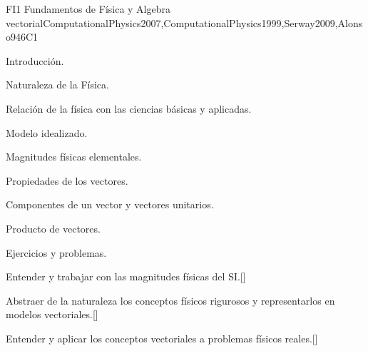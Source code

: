 \begin{syllabus}
\begin{unit}{}{FI1 Fundamentos de Física y Algebra vectorial}{ComputationalPhysics2007,ComputationalPhysics1999,Serway2009,Alonso94}{6}{C1}
\begin{topics}
      \item Introducción.
      \item Naturaleza de la Física.
      \item Relación de la física con las ciencias básicas y aplicadas.
      \item Modelo idealizado.
      \item Magnitudes físicas  elementales.
      \item Propiedades de los vectores.
      \item Componentes de un vector y vectores unitarios.
      \item Producto de vectores.
      \item Ejercicios y problemas.
   \end{topics}

   \begin{learningoutcomes}
      \item Entender y trabajar con las magnitudes físicas del SI.[\Usage]
      \item Abstraer de la naturaleza los conceptos físicos rigurosos y representarlos en modelos vectoriales.[\Usage]
      \item Entender y aplicar los conceptos vectoriales a problemas físicos reales.[\Usage]
   \end{learningoutcomes}
\end{unit}


\end{syllabus}
